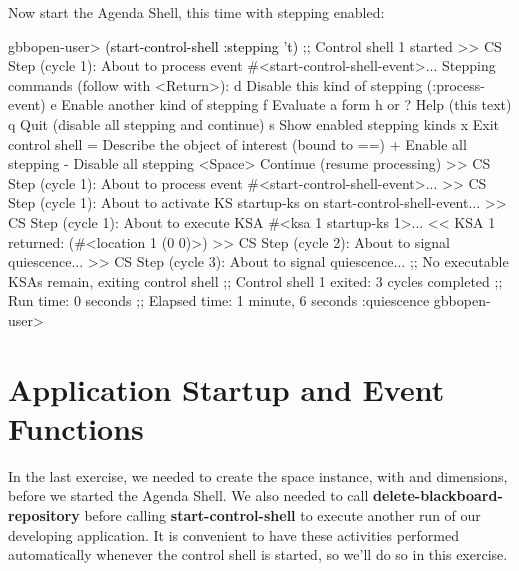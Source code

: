 \documentclass[10pt,twoside,english,pdftex]{article}
\begin{document}
%
%
Now start the Agenda Shell, this time with stepping enabled:
%
\W\supp
\begin{example}
\textcolor{darkergray}{%
  gbbopen-user> \textcolor{black}{(start-control-shell :stepping 't)}
  ;; Control shell 1 started
  >> CS Step (cycle 1):
     About to process event #<start-control-shell-event>... 
  Stepping commands (follow with <Return>):
     d       Disable this kind of stepping (:process-event)
     e       Enable another kind of stepping
     f       Evaluate a form
     h or ?  Help (this text)
     q       Quit (disable all stepping and continue)
     s       Show enabled stepping kinds
     x       Exit control shell
     =       Describe the object of interest (bound to ==)
     +       Enable all stepping
     -       Disable all stepping
     <Space> Continue (resume processing)
  >> CS Step (cycle 1):
     About to process event #<start-control-shell-event>...  
  >> CS Step (cycle 1):
     About to activate KS startup-ks on
       start-control-shell-event... 
  >> CS Step (cycle 1):
     About to execute KSA #<ksa 1 startup-ks 1>... 
  << KSA 1 returned: (#<location 1 (0 0)>)
  >> CS Step (cycle 2):
     About to signal quiescence... 
  >> CS Step (cycle 3):
     About to signal quiescence... 
  ;; No executable KSAs remain, exiting control shell
  ;; Control shell 1 exited: 3 cycles completed
  ;; Run time: 0 seconds
  ;; Elapsed time: 1 minute, 6 seconds
  :quiescence
  gbbopen-user>}
\end{example}


\T\markright{}%
\T\pagestyle{plain}
\T\cleardoublepage
\W{}
\T\pagestyle{fancy}
\T\thispagestyle{fancybottom}
\T\renewcommand{\headrulewidth}{0pt}
\section{Application Startup and Event Functions}
\label{sec:application-startup}%

In the last exercise, we needed to create the  space
instance, with  and  dimensions, before we started the Agenda
Shell.  We also needed to call \textbf{delete-blackboard-repository} before
calling \textbf{start-control-shell} to execute another run of our developing
application.  It is convenient to have these activities performed
automatically whenever the control shell is started, so we'll do so in this
exercise.
\end{document}
